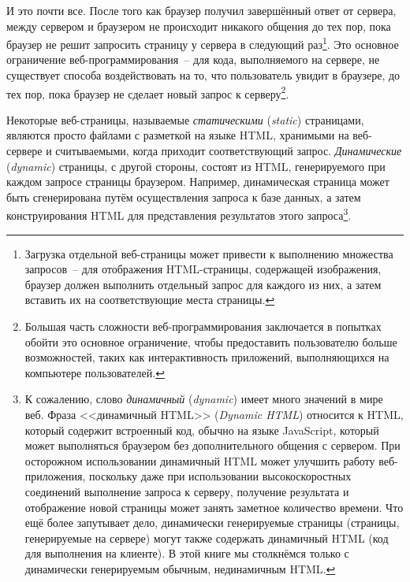 И это почти все. После того как браузер получил завершённый ответ от сервера, между
сервером и браузером не происходит никакого общения до тех пор, пока браузер не решит
запросить страницу у сервера в следующий раз\footnote{Загрузка отдельной веб-страницы
  может привести к выполнению множества запросов~-- для отображения HTML-страницы,
  содержащей изображения, браузер должен выполнить отдельный запрос для каждого из них, а
  затем вставить их на соответствующие места страницы.}. Это основное ограничение
веб-программирования~-- для кода, выполняемого на сервере, не существует способа
воздействовать на то, что пользователь увидит в браузере, до тех пор, пока браузер не
сделает новый запрос к серверу\footnote{Большая часть сложности веб-программирования
  заключается в попытках обойти это основное ограничение, чтобы предоставить пользователю
  больше возможностей, таких как интерактивность приложений, выполняющихся на компьютере
  пользователей.}.

Некоторые веб-страницы, называемые \textit{статическими} (\textit{static}) страницами,
являются просто файлами с разметкой на языке HTML, хранимыми на веб-сервере и считываемыми,
когда приходит соответствующий запрос. \textit{Динамические} (\textit{dynamic}) страницы,
с другой стороны, состоят из HTML, генерируемого при каждом запросе страницы
браузером. Например, динамическая страница может быть сгенерирована путём осуществления
запроса к базе данных, а затем конструирования HTML для представления результатов этого
запроса\footnote{К сожалению, слово \textit{динамичный} (\textit{dynamic}) имеет много
  значений в мире веб. Фраза <<динамичный HTML>> (\textit{Dynamic HTML}) относится к HTML,
  который содержит встроенный код, обычно на языке JavaScript, который может выполняться
  браузером без дополнительного общения с сервером. При осторожном использовании
  динамичный HTML может улучшить работу веб-приложения, поскольку даже при использовании
  высокоскоростных соединений выполнение запроса к серверу, получение результата и
  отображение новой страницы может занять заметное количество времени. Что ещё более
  запутывает дело, динамически генерируемые страницы (страницы, генерируемые на сервере)
  могут также содержать динамичный HTML (код для выполнения на клиенте). В этой книге мы
  столкнёмся только с динамически генерируемым обычным, нединамичным HTML.}.

